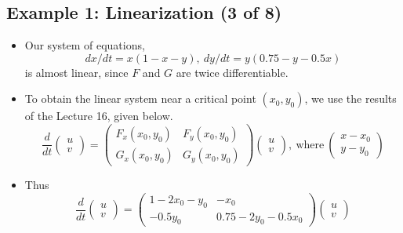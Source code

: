 \documentclass[11pt,a4paper]{article}
\begin{document}
	\subsection*{Example 1: Linearization (3 of 8)}
	\begin{itemize}
		\item Our system of equations,
		$$
		dx/dt = x(1-x-y),\ dy/dt = y(0.75-y-0.5x)
		$$
		is almost linear, since $F$ and $G$ are twice differentiable.
		\item To obtain the linear system near a critical point $(x_0, y_0)$, we use the results of the Lecture 16, given below.
		$$
		\frac{d}{dt} 
		\begin{pmatrix}
			u\\
			v
		\end{pmatrix}=
		\begin{pmatrix}
			F_x(x_0, y_0) & F_y(x_0,y_0)\\
			G_x(x_0,y_0) & G_y(x_0, y_0)
		\end{pmatrix}
		\begin{pmatrix}
			u\\
			v
		\end{pmatrix},\ \text{where}\ 
		\begin{pmatrix}
			x - x_0\\
			y - y_0
		\end{pmatrix}
		$$
		\item Thus
		$$
		\frac{d}{dt}
		\begin{pmatrix}
			u\\
			v
		\end{pmatrix} = 
		\begin{pmatrix}
			1 - 2x_0 - y_0 & -x_0\\
			-0.5y_0 & 0.75 - 2y_0 - 0.5x_0
		\end{pmatrix}
		\begin{pmatrix}
			u\\
			v
		\end{pmatrix}
		$$
	\end{itemize}
\end{document}
